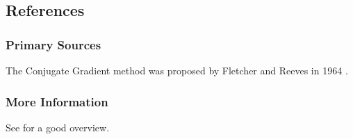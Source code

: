 

\subsection{References}

\subsubsection{Primary Sources}
The Conjugate Gradient method was proposed by Fletcher and Reeves in 1964 \cite{Fletcher1964}.

\subsubsection{More Information}

See \cite{Shewchuk1994} for a good overview.


